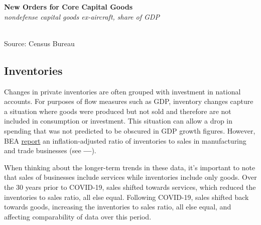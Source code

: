 \documentclass{report}
\makeatletter
\newcommand{\tbllink}[1]{\href{https://raw.githubusercontent.com/bdecon/US-chartbook/master/chartbook/data/#1}{\faTable}}
\newcommand*\short[1]{\expandafter\@gobbletwo\number\numexpr#1\relax}
\newcommand{\shdateaxisticks}{
		date coordinates in=x, axis line style={draw=none},
		xmax={2022-03-15},
		max space between ticks=40,	    
		xtick={{1990-01-01}, {1995-01-01}, {2000-01-01}, 
			{2005-01-01}, {2010-01-01}, {2015-01-01}, {2020-01-01}},
		minor xtick={},
		enlarge y limits={0.06}, enlarge x limits={0.01},
		}
\newcommand{\bbar}[2]{extra #1 ticks = {{#2}}, extra #1 tick labels = ,
		extra #1 tick style = {grid=major, grid style={thick, black!25}},}
\newcommand{\thickline}[4]{\addplot[ultra thick, no markers, color=#1] 
		table [x=#2, y=#3, col sep=comma] {#4};	}
\newcommand{\rebars}{
		\fill[color=black!10] (axis cs:{2007-12-01},\pgfkeysvalueof{/pgfplots/ymin}) rectangle 
			(axis cs:{2009-07-01}, \pgfkeysvalueof{/pgfplots/ymax});
		\fill[color=black!10] (axis cs:{2001-03-01},\pgfkeysvalueof{/pgfplots/ymin}) rectangle 
			(axis cs:{2001-11-01}, \pgfkeysvalueof{/pgfplots/ymax});
		\fill[color=black!10] (axis cs:{2020-02-01},\pgfkeysvalueof{/pgfplots/ymin}) rectangle 
			(axis cs:{2020-05-01}, \pgfkeysvalueof{/pgfplots/ymax});}
\makeatother
\begin{document}
{\begin{minipage}{0.32\textwidth}

\end{minipage} \hspace{6mm}
\begin{minipage}{0.39\textwidth}
\normalsize \textbf{New Orders for Core Capital Goods}\\
\footnotesize{\textit{nondefense capital goods ex-aircraft, share of GDP}}\\
\hspace*{-2mm} \\
\footnotesize{Source: Census Bureau} \hfill \tbllink{dgno.csv}
\end{minipage}
\vspace{10mm}

\begin{minipage}{0.76\textwidth}
\subsection*{Inventories}
\small Changes in private inventories are often grouped with investment in national accounts. For purposes of flow measures such as GDP, inventory changes capture a situation where goods were produced but not sold and therefore are not included in consumption or investment. This situation can allow a drop in spending that was not predicted to be obscured in GDP growth figures. However, BEA \href{https://apps.bea.gov/iTable/index_UD.cfm}{report} an inflation-adjusted ratio of inventories to sales in manufacturing and trade businesses (see {\color{blue!60!green}\textbf{---}}). 

When thinking about the longer-term trends in these data, it's important to note that sales of businesses include services while inventories include only goods. Over the 30 years prior to COVID-19, sales shifted towards services, which reduced the inventories to sales ratio, all else equal. Following COVID-19, sales shifted back towards goods, increasing the inventories to sales ratio, all else equal, and affecting comparability of data over this period. 
\end{minipage}

}
\end{document}

